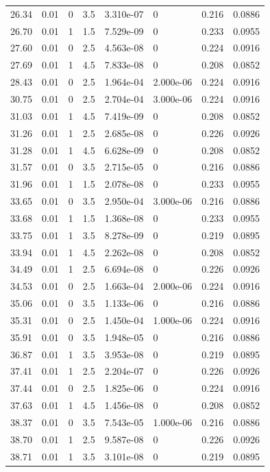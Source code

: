 \documentclass[preview]{standalone}
\begin{document}
{{{\begin{tabular}{L{1.2cm}C{1.2cm} C{0.3cm}C{0.5cm} C{1.4cm}C{1.4cm} C{1.4cm}C{1.4cm}}
  26.34  &  0.01  & 0     & 3.5 &  3.310e-07  & 0  & 0.216 &  0.0886   \\ 
  26.70  &  0.01  & 1     & 1.5 &  7.529e-09  & 0  & 0.233 &  0.0955   \\ 
  27.60  &  0.01  & 0     & 2.5 &  4.563e-08  & 0  & 0.224 &  0.0916   \\ 
  27.69  &  0.01  & 1     & 4.5 &  7.833e-08  & 0  & 0.208 &  0.0852   \\ 
  28.43  &  0.01  & 0     & 2.5 &  1.964e-04  & 2.000e-06  & 0.224 &  0.0916   \\ 
  30.75  &  0.01  & 0     & 2.5 &  2.704e-04  & 3.000e-06  & 0.224 &  0.0916   \\ 
  31.03  &  0.01  & 1     & 4.5 &  7.419e-09  & 0  & 0.208 &  0.0852   \\ 
  31.26  &  0.01  & 1     & 2.5 &  2.685e-08  & 0  & 0.226 &  0.0926   \\ 
  31.28  &  0.01  & 1     & 4.5 &  6.628e-09  & 0  & 0.208 &  0.0852   \\ 
  31.57  &  0.01  & 0     & 3.5 &  2.715e-05  & 0  & 0.216 &  0.0886   \\ 
  31.96  &  0.01  & 1     & 1.5 &  2.078e-08  & 0  & 0.233 &  0.0955   \\ 
  33.65  &  0.01  & 0     & 3.5 &  2.950e-04  & 3.000e-06  & 0.216 &  0.0886   \\ 
  33.68  &  0.01  & 1     & 1.5 &  1.368e-08  & 0  & 0.233 &  0.0955   \\ 
  33.75  &  0.01  & 1     & 3.5 &  8.278e-09  & 0  & 0.219 &  0.0895   \\ 
  33.94  &  0.01  & 1     & 4.5 &  2.262e-08  & 0  & 0.208 &  0.0852   \\ 
  34.49  &  0.01  & 1     & 2.5 &  6.694e-08  & 0  & 0.226 &  0.0926   \\ 
  34.53  &  0.01  & 0     & 2.5 &  1.663e-04  & 2.000e-06  & 0.224 &  0.0916   \\ 
  35.06  &  0.01  & 0     & 3.5 &  1.133e-06  & 0  & 0.216 &  0.0886   \\ 
  35.31  &  0.01  & 0     & 2.5 &  1.450e-04  & 1.000e-06  & 0.224 &  0.0916   \\ 
  35.91  &  0.01  & 0     & 3.5 &  1.948e-05  & 0  & 0.216 &  0.0886   \\ 
  36.87  &  0.01  & 1     & 3.5 &  3.953e-08  & 0  & 0.219 &  0.0895   \\ 
  37.41  &  0.01  & 1     & 2.5 &  2.204e-07  & 0  & 0.226 &  0.0926   \\ 
  37.44  &  0.01  & 0     & 2.5 &  1.825e-06  & 0  & 0.224 &  0.0916   \\ 
  37.63  &  0.01  & 1     & 4.5 &  1.456e-08  & 0  & 0.208 &  0.0852   \\ 
  38.37  &  0.01  & 0     & 3.5 &  7.543e-05  & 1.000e-06  & 0.216 &  0.0886   \\ 
  38.70  &  0.01  & 1     & 2.5 &  9.587e-08  & 0  & 0.226 &  0.0926   \\ 
  38.71  &  0.01  & 1     & 3.5 &  3.101e-08  & 0  & 0.219 &  0.0895   \\ 
\hline 
\end{tabular} 

}}}
\end{document}
